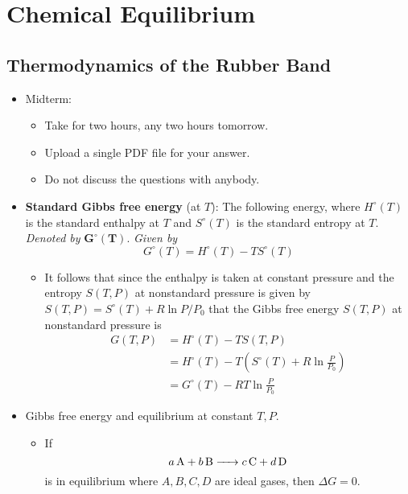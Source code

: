 \documentclass[../notes.tex]{subfiles}
\begin{document}
\chapter{Chemical Equilibrium}
\section{Thermodynamics of the Rubber Band}
\begin{itemize}
    \item {}Midterm:
    \begin{itemize}
        \item Take for two hours, any two hours tomorrow.
        \item Upload a single PDF file for your answer.
        \item Do not discuss the questions with anybody.
    \end{itemize}
    \item \textbf{Standard Gibbs free energy} (at $T$): The following energy, where $H^\circ(T)$ is the standard enthalpy at $T$ and $S^\circ(T)$ is the standard entropy at $T$. \emph{Denoted by} $\bm{G^\circ(T)}$. \emph{Given by}
    \begin{equation*}
        G^\circ(T) = H^\circ(T)-TS^\circ(T)
    \end{equation*}
    \begin{itemize}
        \item It follows that since the enthalpy is taken at constant pressure and the entropy $S(T,P)$ at nonstandard pressure is given by $S(T,P)=S^\circ(T)+R\ln P/P_0$ that the Gibbs free energy $S(T,P)$ at nonstandard pressure is
        \begin{align*}
            G(T,P) &= H^\circ(T)-TS(T,P)\\
            &= H^\circ(T)-T\left( S^\circ(T)+R\ln\frac{P}{P_0} \right)\\
            &= G^\circ(T)-RT\ln\frac{P}{P_0}
        \end{align*}
    \end{itemize}
    \item Gibbs free energy and equilibrium at constant $T,P$.
    \begin{itemize}
        \item If
        \begin{equation*}
            \ce{$a$A + $b$B -> $c$C + $d$D}
        \end{equation*}
        is in equilibrium where $A,B,C,D$ are ideal gases, then $\Delta G=0$.

\end{itemize}
\end{itemize}
\end{document}
